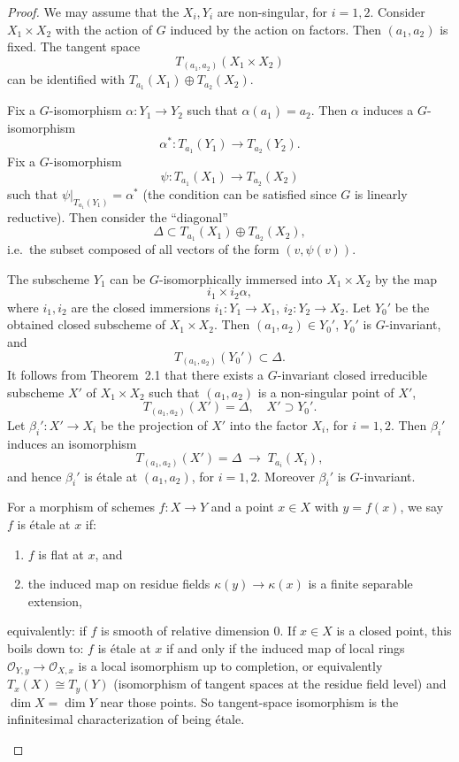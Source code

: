 \documentclass[12pt]{article}
\begin{document}
\begin{proof}
We may assume that the $X_i, Y_i$ are non-singular, for $i=1,2$.  
Consider $X_1 \times X_2$ with the action of $G$ induced by the action on factors.  
Then $(a_1,a_2)$ is fixed. The tangent space
\[
   T_{(a_1,a_2)}(X_1 \times X_2)
\]
can be identified with $T_{a_1}(X_1) \oplus T_{a_2}(X_2)$.  

Fix a $G$-isomorphism $\alpha : Y_1 \to Y_2$ such that $\alpha(a_1)=a_2$.  
Then $\alpha$ induces a $G$-isomorphism 
\[
   \alpha^* : T_{a_1}(Y_1) \to T_{a_2}(Y_2).
\]
Fix a $G$-isomorphism 
\[
   \psi : T_{a_1}(X_1) \to T_{a_2}(X_2)
\]
such that $\psi|_{T_{a_1}(Y_1)} = \alpha^*$ (the condition can be satisfied since $G$ is linearly reductive). Then consider the ``diagonal'' 
\[
   \Delta \subset T_{a_1}(X_1)\oplus T_{a_2}(X_2),
\]
i.e.\ the subset composed of all vectors of the form $(v,\psi(v))$.  

The subscheme $Y_1$ can be $G$-isomorphically immersed into $X_1 \times X_2$ by the map 
\[
   i_1 \times i_2 \alpha,
\]
where $i_1, i_2$ are the closed immersions $i_1 : Y_1 \to X_1$, $i_2 : Y_2 \to X_2$.  
Let $Y_0'$ be the obtained closed subscheme of $X_1 \times X_2$. Then $(a_1,a_2)\in Y_0'$, $Y_0'$ is $G$-invariant, and
\[
   T_{(a_1,a_2)}(Y_0') \subset \Delta.
\]
It follows from Theorem~2.1 that there exists a $G$-invariant closed irreducible subscheme $X'$ of $X_1 \times X_2$ such that $(a_1,a_2)$ is a non-singular point of $X'$, 
\[
   T_{(a_1,a_2)}(X') = \Delta, \quad X'\supset Y_0'.
\]
Let $\beta_i' : X' \to X_i$ be the projection of $X'$ into the factor $X_i$, for $i=1,2$.  
Then $\beta_i'$ induces an isomorphism 
\[
   T_{(a_1,a_2)}(X') = \Delta \;\to\; T_{a_i}(X_i),
\]
and hence $\beta_i'$ is \'etale at $(a_1,a_2)$, for $i=1,2$. Moreover $\beta_i'$ is $G$-invariant.  

\begin{remark}
    For a morphism of schemes $f: X \to Y$ and a point $x \in X$ with $y=f(x)$, we say $f$ is étale at $x$ if:
    \begin{enumerate}
        \item $f$ is flat at $x$, and
        \item the induced map on residue fields $\kappa(y) \to \kappa(x)$ is a finite separable extension,
    \end{enumerate}
    equivalently: if $f$ is smooth of relative dimension $0$. If $x \in X$ is a closed point, this boils down to: $f$ is étale at $x$ if and only if the induced map of local rings
    $\mathcal{O}_{Y,y} \to \mathcal{O}_{X,x}$
    is a local isomorphism up to completion, or equivalently
    $T_x(X) \cong T_y(Y)$
    (isomorphism of tangent spaces at the residue field level) and $\dim X = \dim Y$ near those points. So tangent-space isomorphism is the infinitesimal characterization of being étale.
\end{remark}


\end{proof}
\end{document}
